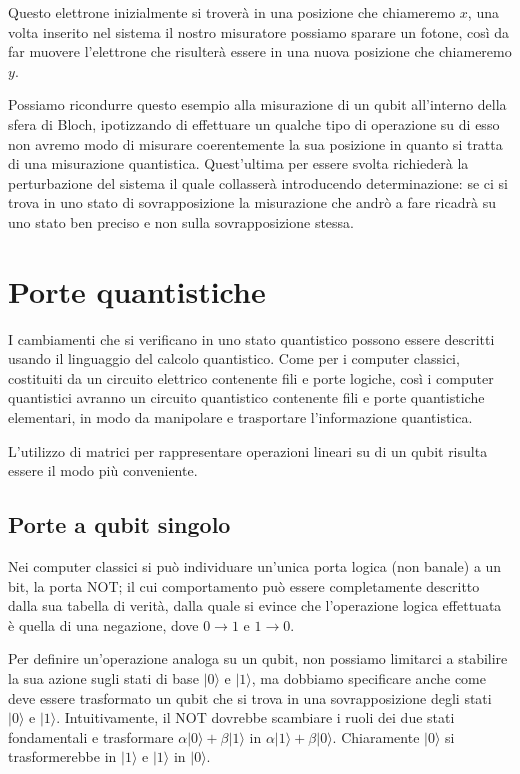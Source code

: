 Questo elettrone inizialmente si troverà in una posizione che chiameremo $x$, una volta inserito nel sistema il nostro misuratore possiamo sparare un fotone, così da far muovere l'elettrone che risulterà essere in una nuova posizione che chiameremo $y$.

Possiamo ricondurre questo esempio alla misurazione di un qubit all'interno della sfera di Bloch, ipotizzando di effettuare un qualche tipo di operazione su di esso non avremo modo di misurare coerentemente la sua posizione in quanto si tratta di una misurazione quantistica.
Quest'ultima per essere svolta richiederà la perturbazione del sistema il quale collasserà introducendo determinazione: se ci si trova in uno stato di sovrapposizione la misurazione che andrò a fare ricadrà su uno stato ben preciso e non sulla sovrapposizione stessa.

\section{Porte quantistiche}
I cambiamenti che si verificano in uno stato quantistico possono essere descritti usando il linguaggio del calcolo quantistico.
Come per i computer classici, costituiti da un circuito elettrico contenente fili e porte logiche, così i computer quantistici avranno un circuito quantistico contenente fili e porte quantistiche elementari, in modo da manipolare e trasportare l'informazione quantistica.

L'utilizzo di matrici per rappresentare operazioni lineari \cite{algebra2015book} su di un qubit risulta essere il modo più conveniente.

\subsection{Porte a qubit singolo}
Nei computer classici si può individuare un'unica porta logica (non banale) a un bit, la porta NOT; il cui comportamento può essere completamente descritto dalla sua tabella di verità, dalla quale si evince che l'operazione logica effettuata è quella di una negazione, dove $0\rightarrow1$ e $1\rightarrow0$.

Per definire un'operazione analoga su un qubit, non possiamo limitarci a stabilire la sua azione sugli stati di base $|0\rangle$ e $|1\rangle$, ma dobbiamo specificare anche come deve essere trasformato un qubit che si trova in una sovrapposizione degli stati $|0\rangle$ e $|1\rangle$.
Intuitivamente, il NOT dovrebbe scambiare i ruoli dei due stati fondamentali e trasformare $\alpha|0\rangle + \beta|1\rangle$ in $\alpha|1\rangle + \beta|0\rangle$.
Chiaramente $|0\rangle$ si trasformerebbe in $|1\rangle$ e $|1\rangle$ in $|0\rangle$.

